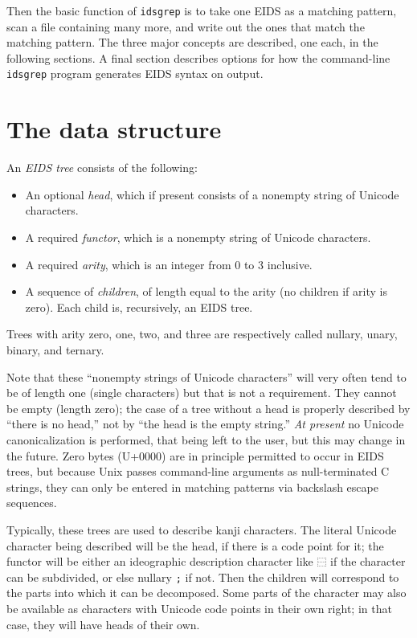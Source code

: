 \documentclass[twocolumn]{report}
\begin{document}
Then the basic function of \texttt{idsgrep} is to take one EIDS as a
matching pattern, scan a file containing many more, and write out the ones
that match the matching pattern.  The three major concepts are described,
one each, in the following sections.  A final section describes options for
how the command-line \texttt{idsgrep} program
generates EIDS syntax on output.


\section{The data structure}

An \emph{EIDS tree} consists of the following:

\begin{itemize}
  \item An optional \emph{head}, which if present consists of a nonempty
    string of Unicode characters.
  \item A required \emph{functor}, which is a nonempty string of Unicode
    characters.
  \item A required \emph{arity}, which is an integer from 0 to 3 inclusive.
  \item A sequence of \emph{children}, of length equal to the arity (no
    children if arity is zero).  Each child is, recursively, an EIDS tree.
\end{itemize}

Trees with arity zero, one, two, and three are respectively called
nullary, unary, binary, and ternary.

Note that these ``nonempty strings of Unicode characters'' will very often
tend to be of length one (single characters) but that is not a requirement. 
They cannot be empty (length zero); the case of a tree without a head is
properly described by ``there is no head,'' not by ``the head is the empty
string.'' \emph{At present} no Unicode canonicalization is performed, that
being left to the user, but this may change in the future.  Zero bytes
(U+0000) are in principle permitted to occur in EIDS trees, but because
Unix passes command-line arguments as null-terminated C strings, they can
only be entered in matching patterns via backslash escape sequences.

Typically, these trees are used to describe kanji characters.  The literal
Unicode character being described will be the head, if there is a code point
for it; the functor will be either an ideographic description character like
\texttt{⿱} if the character can be subdivided, or else nullary \texttt{;}
if not.  Then the children will correspond to the parts into which it can be
decomposed.  Some parts of the character may also be available as
characters with Unicode code points in their own right; in that case, they
will have heads of their own.
\end{document}
